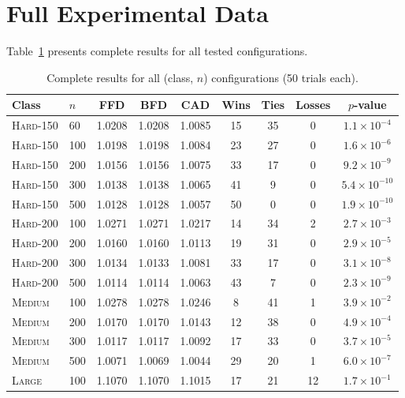 \documentclass[11pt]{article}
\begin{document}
\appendix
\section{Full Experimental Data}
\label{app:full}

Table~\ref{tab:full} presents complete results for all tested configurations.

\begin{table}[h]
\centering
\caption{Complete results for all (class, $n$) configurations (50 trials each).}
\label{tab:full}
\small
\begin{tabular}{llccccccc}
\toprule
\textbf{Class} & $n$ & FFD & BFD & CAD & Wins & Ties & Losses & $p$-value \\
\midrule
\textsc{Hard-150} & 60  & 1.0208 & 1.0208 & 1.0085 & 15 & 35 & 0 & $1.1 \times 10^{-4}$ \\
\textsc{Hard-150} & 100 & 1.0198 & 1.0198 & 1.0084 & 23 & 27 & 0 & $1.6 \times 10^{-6}$ \\
\textsc{Hard-150} & 200 & 1.0156 & 1.0156 & 1.0075 & 33 & 17 & 0 & $9.2 \times 10^{-9}$ \\
\textsc{Hard-150} & 300 & 1.0138 & 1.0138 & 1.0065 & 41 &  9 & 0 & $5.4 \times 10^{-10}$ \\
\textsc{Hard-150} & 500 & 1.0128 & 1.0128 & 1.0057 & 50 &  0 & 0 & $1.9 \times 10^{-10}$ \\
\textsc{Hard-200} & 100 & 1.0271 & 1.0271 & 1.0217 & 14 & 34 & 2 & $2.7 \times 10^{-3}$ \\
\textsc{Hard-200} & 200 & 1.0160 & 1.0160 & 1.0113 & 19 & 31 & 0 & $2.9 \times 10^{-5}$ \\
\textsc{Hard-200} & 300 & 1.0134 & 1.0133 & 1.0081 & 33 & 17 & 0 & $3.1 \times 10^{-8}$ \\
\textsc{Hard-200} & 500 & 1.0114 & 1.0114 & 1.0063 & 43 &  7 & 0 & $2.3 \times 10^{-9}$ \\
\textsc{Medium}   & 100 & 1.0278 & 1.0278 & 1.0246 &  8 & 41 & 1 & $3.9 \times 10^{-2}$ \\
\textsc{Medium}   & 200 & 1.0170 & 1.0170 & 1.0143 & 12 & 38 & 0 & $4.9 \times 10^{-4}$ \\
\textsc{Medium}   & 300 & 1.0117 & 1.0117 & 1.0092 & 17 & 33 & 0 & $3.7 \times 10^{-5}$ \\
\textsc{Medium}   & 500 & 1.0071 & 1.0069 & 1.0044 & 29 & 20 & 1 & $6.0 \times 10^{-7}$ \\
\textsc{Large}    & 100 & 1.1070 & 1.1070 & 1.1015 & 17 & 21 & 12 & $1.7 \times 10^{-1}$ \\
\bottomrule
\end{tabular}
\end{table}
\end{document}
